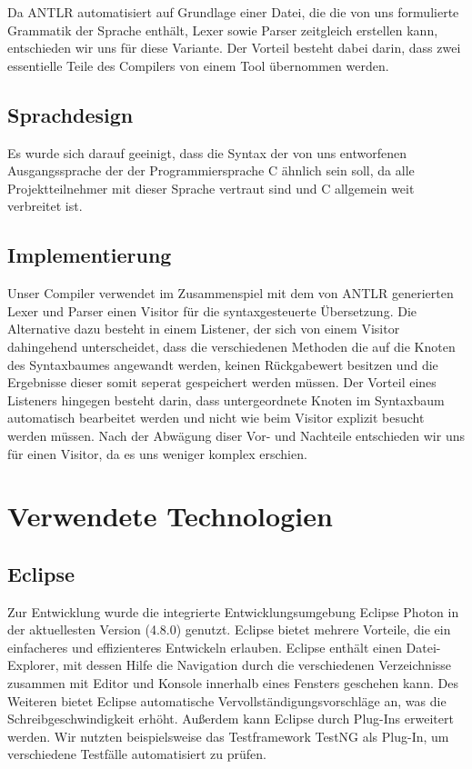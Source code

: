 \documentclass[12pt, a4paper, oneside, ngerman]{article}
\begin{document}
Da ANTLR automatisiert auf Grundlage einer Datei, die die von uns formulierte Grammatik der Sprache enthält, Lexer sowie Parser zeitgleich erstellen kann, entschieden wir uns für diese Variante. Der Vorteil besteht dabei darin, dass zwei essentielle Teile des Compilers von einem Tool übernommen werden. 

\subsection{Sprachdesign}
Es wurde sich darauf geeinigt, dass die Syntax der von uns entworfenen Ausgangssprache der der Programmiersprache C ähnlich sein soll, da alle Projektteilnehmer mit dieser Sprache vertraut sind und C allgemein weit verbreitet ist.

\subsection{Implementierung}
Unser Compiler verwendet im Zusammenspiel mit dem von ANTLR generierten Lexer und Parser einen Visitor für die syntaxgesteuerte Übersetzung. Die Alternative dazu besteht in einem Listener, der sich von einem Visitor dahingehend unterscheidet, dass die verschiedenen Methoden die auf die Knoten des Syntaxbaumes angewandt werden, keinen Rückgabewert besitzen und die Ergebnisse dieser somit seperat gespeichert werden müssen. Der Vorteil eines Listeners hingegen besteht darin, dass untergeordnete Knoten im Syntaxbaum automatisch bearbeitet werden und nicht wie beim Visitor explizit besucht werden müssen. Nach der Abwägung diser Vor- und Nachteile entschieden wir uns für einen Visitor, da es uns weniger komplex erschien.




\pagebreak
\section{Verwendete Technologien}

\subsection{Eclipse}
Zur Entwicklung wurde die integrierte Entwicklungsumgebung Eclipse Photon in der aktuellesten Version (4.8.0) genutzt. 
Eclipse bietet mehrere Vorteile, die ein einfacheres und effizienteres Entwickeln erlauben. Eclipse enthält einen Datei-Explorer, mit dessen Hilfe die Navigation durch die verschiedenen Verzeichnisse zusammen mit Editor und Konsole innerhalb eines Fensters geschehen kann. Des Weiteren bietet Eclipse automatische Vervollständigungsvorschläge an, was die Schreibgeschwindigkeit erhöht. 
Außerdem kann Eclipse durch Plug-Ins erweitert werden. Wir nutzten beispielsweise das Testframework TestNG als Plug-In, um verschiedene Testfälle automatisiert zu prüfen.
\end{document}
